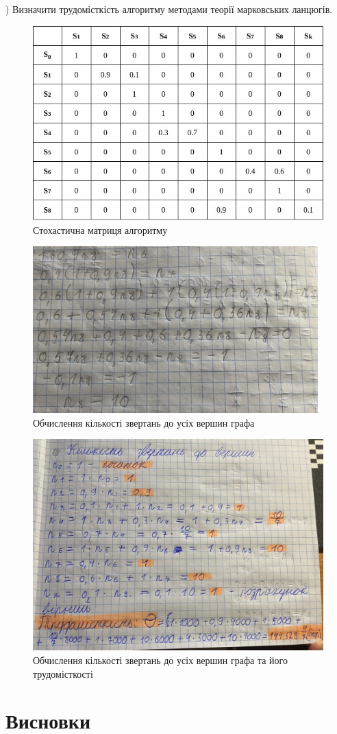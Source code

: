 ) Визначити трудомісткість алгоритму методами теорії марковських
ланцюгів.
\begin{figure}[h]
    \vspace{10mm} 
    \centering
    \includegraphics[width=14cm]{reports/algos/lab1/assets/6.jpg}
    \caption{Стохастична матриця алгоритму}
\end{figure}

\begin{figure}[h] 
    \centering
    \includegraphics[width=11cm]{reports/algos/lab1/assets/8.jpg}
    \caption{Обчислення кількості звертань до усіх вершин графа}
\end{figure}

\begin{figure}[h]
    \centering
    \includegraphics[width=16cm]{reports/algos/lab1/assets/7.jpg}
    \caption{Обчислення кількості звертань до усіх вершин графа та його трудомісткості}
\end{figure}

\clearpage
\section{Висновки}
